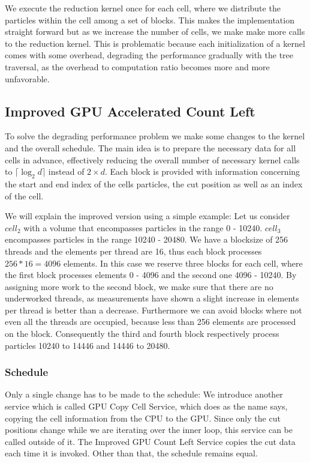 \documentclass[]{article}
\begin{document}
We execute the reduction kernel once for each cell, where we distribute the particles within the cell among a set of blocks. This makes the implementation straight forward but as we increase the number of cells, we make make more calls to the reduction kernel. This is problematic because each initialization of a kernel comes with some overhead, degrading the performance gradually with the tree traversal, as the overhead to computation ratio becomes more and more unfavorable.  



\subsection{Improved GPU Accelerated Count Left} \label{imprctl}

To solve the degrading performance problem we make some changes to the kernel and the overall schedule. The main idea is to prepare the necessary data for all cells in advance, effectively reducing the overall number of necessary kernel calls to $\lceil \log_2 d \rceil $ instead of $2 \times d$. Each block is provided with information concerning the start and end index of the cells particles, the cut position as well as an index of the cell. 

We will explain the improved version using a simple example: Let us consider $cell_2$ with a volume that encompasses particles in the range 0 - 10240. $cell_3$ encompasses particles in the range 10240 - 20480. We have a blocksize of 256 threads and the elements per thread are 16, thus each block processes $256 * 16 = 4096$ elements. In this case we reserve three blocks for each cell, where the first block processes elements 0 - 4096 and the second one 4096 - 10240. By assigning more work to the second block, we make sure that there are no underworked threads, as measurements have shown a slight increase in elements per thread is better than a decrease. Furthermore we can avoid blocks where not even all the threads are occupied, because less than 256 elements are processed on the block. Consequently the third and fourth block respectively process particles 10240 to 14446 and 14446 to 20480. 

\subsubsection{Schedule}

Only a single change has to be made to the schedule: We introduce another service which is called GPU Copy Cell Service, which does as the name says, copying the cell information from the CPU to the GPU. Since only the cut positions change while we are iterating over the inner loop, this service can be called outside of it. The Improved GPU Count Left Service copies the cut data each time it is invoked. Other than that, the schedule remains equal. 
\end{document}
